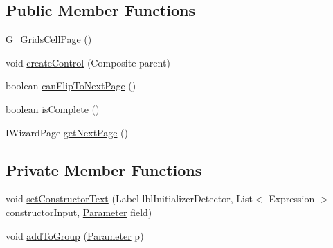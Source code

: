 \subsection*{Public Member Functions}
\begin{DoxyCompactItemize}
\item 
\hyperlink{classit_1_1isislab_1_1masonhelperdocumentation_1_1mason_1_1wizards_1_1_g___grids_cell_page_af33b62cf057dea8cef01b24fee0b3d33}{G\-\_\-\-Grids\-Cell\-Page} ()
\item 
void \hyperlink{classit_1_1isislab_1_1masonhelperdocumentation_1_1mason_1_1wizards_1_1_g___grids_cell_page_a603dbeaa44f996a7cfc07924305019ca}{create\-Control} (Composite parent)
\item 
boolean \hyperlink{classit_1_1isislab_1_1masonhelperdocumentation_1_1mason_1_1wizards_1_1_g___grids_cell_page_af14e56675c9f38d17cef651429690115}{can\-Flip\-To\-Next\-Page} ()
\item 
boolean \hyperlink{classit_1_1isislab_1_1masonhelperdocumentation_1_1mason_1_1wizards_1_1_g___grids_cell_page_a9b35e84b7ba5df3f5e0d6c49e933e43e}{is\-Complete} ()
\item 
I\-Wizard\-Page \hyperlink{classit_1_1isislab_1_1masonhelperdocumentation_1_1mason_1_1wizards_1_1_g___grids_cell_page_ae8b68163bdae6194abe3890b0cdbdfd0}{get\-Next\-Page} ()
\end{DoxyCompactItemize}
\subsection*{Private Member Functions}
\begin{DoxyCompactItemize}
\item 
void \hyperlink{classit_1_1isislab_1_1masonhelperdocumentation_1_1mason_1_1wizards_1_1_g___grids_cell_page_a10e043dce0e8661cadbb7a6ea569cb0e}{set\-Constructor\-Text} (Label lbl\-Initializer\-Detector, List$<$ Expression $>$ constructor\-Input, \hyperlink{classit_1_1isislab_1_1masonhelperdocumentation_1_1analizer_1_1_parameter}{Parameter} field)
\item 
void \hyperlink{classit_1_1isislab_1_1masonhelperdocumentation_1_1mason_1_1wizards_1_1_g___grids_cell_page_a43c0ab8367d25f1cfd0cdc9e29f46e5c}{add\-To\-Group} (\hyperlink{classit_1_1isislab_1_1masonhelperdocumentation_1_1analizer_1_1_parameter}{Parameter} p)
\end{DoxyCompactItemize}
